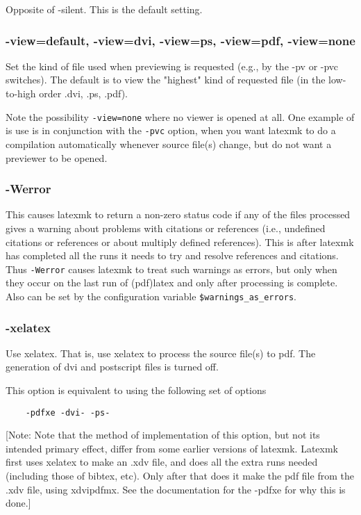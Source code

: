 Opposite of -silent.  This is the default setting.

\subsubsection{-view=default, -view=dvi, -view=ps, -view=pdf, -view=none}

Set the kind of file used when previewing is requested (e.g., by the -pv or
-pvc switches).  The default is to view the "highest" kind of requested file
(in  the  low-to-high  order  .dvi,  .ps, .pdf).

Note  the  possibility  \verb|-view=none|  where no viewer is opened at all.
One example of is use is in conjunction with the \verb|-pvc|  option,  when  you
want latexmk to do a compilation automatically whenever source file(s) change,
but do not want a  previewer  to be opened.

\subsubsection{-Werror}

This  causes  latexmk to return a non-zero status code if any of the files
processed gives a warning about  problems  with  citations  or references
(i.e., undefined citations or references or about multiply defined references).
This is after  latexmk  has completed  all  the  runs it needs to try and
resolve references and citations.  Thus \verb|-Werror| causes latexmk to treat
such  warnings  as  errors,  but  only  when they occur on the last run of
(pdf)latex and only after processing is complete.  Also  can  be set by the
configuration variable \verb|$warnings_as_errors|.

\subsubsection{-xelatex}

Use xelatex.  That is, use xelatex to process the source file(s) to pdf.  The
generation of dvi and postscript  files  is  turned off.

This option is equivalent to using the following set of options

\begin{verbatim}
	-pdfxe -dvi- -ps-
\end{verbatim}

[Note:  Note  that  the method of implementation of this option,
but not its intended primary effect, differ  from  some  earlier
versions  of latexmk. Latexmk first uses xelatex to make an .xdv
file, and does all the extra runs  needed  (including  those  of
bibtex,  etc).   Only  after that does it make the pdf file from
the .xdv file, using xdvipdfmx.  See the documentation  for  the
-pdfxe for why this is done.]


